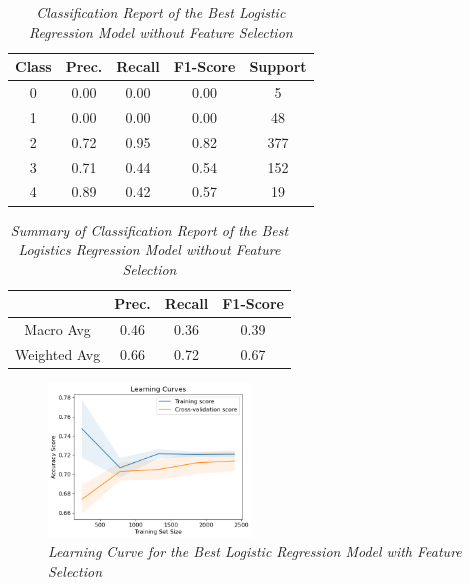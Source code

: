 \begin{table}[!ht]
    \begin{center}
        \begin{tabular}{c|c|c|c|c}			
            \hline
            Class & Prec. & Recall & F1-Score & Support \\
            \hline\hline
            0 & 0.00 & 0.00 & 0.00 & 5 \\
            1 & 0.00 & 0.00 & 0.00 & 48 \\
            2 & 0.72 & 0.95 & 0.82 & 377 \\
            3 & 0.71 & 0.44 & 0.54 & 152 \\
            4 & 0.89 & 0.42 & 0.57 & 19\\
            \hline
        \end{tabular}

        \caption{\textit{Classification Report of the Best Logistic Regression Model without Feature Selection}}
        \label{logr-ft-report}

    \end{center}
\end{table}
\begin{table}[!ht]
    \begin{center}
        \begin{tabular}{c||c|c|c}			
            \hline
             & Prec. & Recall & F1-Score \\
             \hline\hline
            Macro Avg & 0.46 & 0.36 & 0.39 \\
            Weighted Avg & 0.66 & 0.72 & 0.67 \\
            \hline
        \end{tabular}

        \caption{\textit{Summary of Classification Report of the Best Logistics Regression Model without Feature Selection}}
        \label{logr-ft-report-sum}

    \end{center}
\end{table}
\begin{figure}[!ht]
    \includegraphics[width = 0.48\textwidth]{res/logr-ft-lc.png}
    \caption{\textit{Learning Curve for the Best Logistic Regression Model with Feature Selection}}
    \label{fig:logr-ft-lc}
\end{figure}


